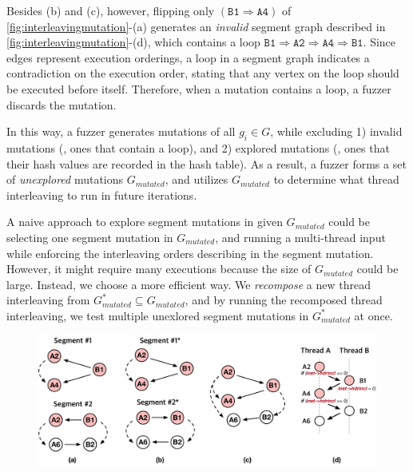Besides (b) and (c), however, flipping only
$(\texttt{B1} \Rightarrow \texttt{A4})$ of
\autoref{fig:interleavingmutation}-(a) generates an \textit{invalid}
segment graph described in \autoref{fig:interleavingmutation}-(d),
which contains a loop
$\texttt{B1} \Rightarrow \texttt{A2} \Rightarrow \texttt{A4}
\Rightarrow \texttt{B1}$.
%
Since edges represent execution orderings, a loop in a segment graph
indicates a contradiction on the execution order, stating that any
vertex on the loop should be executed before itself. Therefore, when a
mutation contains a loop, a fuzzer discards the mutation.
%


In this way, a fuzzer generates mutations of all $g_i \in G$, while
excluding 1) invalid mutations (\ie, ones that contain a loop), and 2)
explored mutations (\ie, ones that their hash values are recorded in
the hash table).
%
As a result, a fuzzer forms a set of \textit{unexplored} mutations
$G_{mutated}$, and utilizes $G_{mutated}$ to determine what thread
interleaving to run in future iterations.





%
A naive approach to explore segment mutations in given $G_{mutated}$
could be selecting one segment mutation in $G_{mutated}$, and running
a multi-thread input while enforcing the interleaving orders
describing in the segment mutation.
%
However, it might require many executions because the size of
$G_{mutated}$ could be large.  Instead, we choose a more efficient
way. We \textit{recompose} a new thread interleaving from
$G^*_{mutated} \subseteq G_{mutated}$, and by running the recomposed
thread interleaving, we test multiple unexlored segment mutations in
$G^*_{mutated}$ at once.


\begin{figure}[t]
  \centering
  \includegraphics[width=\linewidth]{fig/hint.pdf}
  \caption{}
  \label{fig:hint}
\end{figure}



